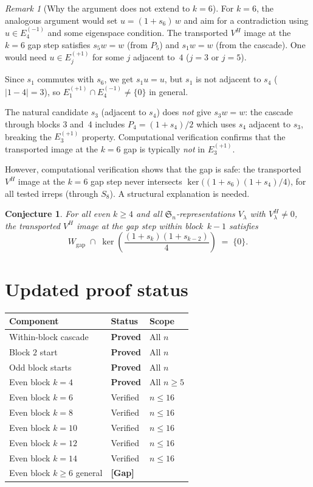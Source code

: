 \documentclass[11pt]{article}
\newtheorem{conjecture}[theorem]{Conjecture}
\theoremstyle{definition}
\theoremstyle{remark}
\newtheorem{remark}[theorem]{Remark}
\newcommand{\Sym}{\mathfrak{S}}
\begin{document}
\begin{remark}[Why the argument does not extend to $k = 6$]
For $k = 6$, the analogous argument would set $u = (1 + s_6)\,w$
and aim for a contradiction using $u \in E_4^{(-1)}$ and some
eigenspace condition. The transported $V^H$ image at the $k = 6$ gap
step satisfies $s_5 w = w$ (from $P_5$) and $s_1 w = w$ (from the
cascade). One would need $u \in E_j^{(+1)}$ for some $j$ adjacent
to~$4$ ($j = 3$ or $j = 5$).

Since $s_1$ commutes with $s_6$, we get $s_1 u = u$, but
$s_1$ is not adjacent to $s_4$ ($|1 - 4| = 3$), so
$E_1^{(+1)} \cap E_4^{(-1)} \ne \{0\}$ in general.

The natural candidate $s_3$ (adjacent to $s_4$) does \emph{not}
give $s_3 w = w$: the cascade through blocks 3 and~4 includes
$P_4 = (1 + s_4)/2$ which uses $s_4$ adjacent to $s_3$, breaking
the $E_3^{(+1)}$ property. Computational verification confirms
that the transported image at the $k = 6$ gap is typically
\emph{not} in $E_3^{(+1)}$.

However, computational verification shows that the gap is safe:
the transported $V^H$ image at the $k = 6$ gap step never
intersects $\ker\bigl((1{+}s_6)(1{+}s_4)/4\bigr)$, for all
tested irreps (through $S_8$). A structural explanation is needed.
\end{remark}

\begin{conjecture}\label{conj:even-general}
For all even $k \ge 4$ and all $\Sym_n$-representations $V_\lambda$
with $V_\lambda^H \ne 0$, the transported $V^H$ image at the gap
step within block~$k{-}1$ satisfies
\[
  W_{\mathrm{gap}} \;\cap\; \ker\!\left(\frac{(1+s_k)(1+s_{k-2})}{4}\right)
  \;=\; \{0\}.
\]
\end{conjecture}


\section{Updated proof status}

\begin{center}
\begin{tabular}{lll}
\toprule
\textbf{Component} & \textbf{Status} & \textbf{Scope} \\
\midrule
Within-block cascade & \textbf{Proved} & All $n$ \\
Block $2$ start & \textbf{Proved} & All $n$ \\
Odd block starts & \textbf{Proved} & All $n$ \\
Even block $k = 4$ & \textbf{Proved} & All $n \ge 5$ \\
\midrule
Even block $k = 6$ & Verified & $n \le 16$ \\
Even block $k = 8$ & Verified & $n \le 16$ \\
Even block $k = 10$ & Verified & $n \le 16$ \\
Even block $k = 12$ & Verified & $n \le 16$ \\
Even block $k = 14$ & Verified & $n \le 16$ \\
Even block $k \ge 6$ general & \textbf{[Gap]} & \\
\bottomrule
\end{tabular}
\end{center}
\end{document}
